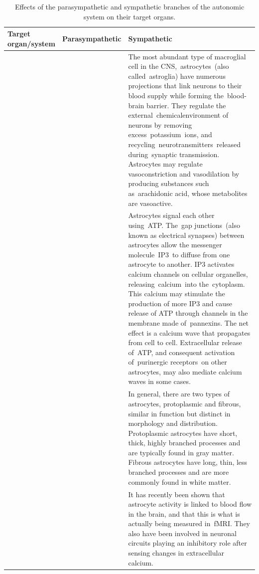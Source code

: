 \begin{longtable}[t]{>{\raggedright\arraybackslash}p{5em}>{\raggedright\arraybackslash}p{5em}>{\raggedright\arraybackslash}p{40em}}
\caption{\label{tab:autonomic}Effects of the parasympathetic and sympathetic branches of the autonomic system on their target organs.}\\
\toprule
Target organ/system & Parasympathetic & Sympathetic\\
\midrule
\rowcolor{gray!6}   &  & The most abundant type of macroglial cell in the CNS, astrocytes (also called astroglia) have numerous projections that link neurons to their blood supply while forming the blood-brain barrier. They regulate the external chemicalenvironment of neurons by removing excess potassium ions, and recycling neurotransmitters released during synaptic transmission. Astrocytes may regulate vasoconstriction and vasodilation by producing substances such as arachidonic acid, whose metabolites are vasoactive.\\

 &  & Astrocytes signal each other using ATP. The gap junctions (also known as electrical synapses) between astrocytes allow the messenger molecule IP3 to diffuse from one astrocyte to another. IP3 activates calcium channels on cellular organelles, releasing calcium into the cytoplasm. This calcium may stimulate the production of more IP3 and cause release of ATP through channels in the membrane made of pannexins. The net effect is a calcium wave that propagates from cell to cell. Extracellular release of ATP, and consequent activation of purinergic receptors on other astrocytes, may also mediate calcium waves in some cases.\\

\rowcolor{gray!6}   &  & In general, there are two types of astrocytes, protoplasmic and fibrous, similar in function but distinct in morphology and distribution. Protoplasmic astrocytes have short, thick, highly branched processes and are typically found in gray matter. Fibrous astrocytes have long, thin, less branched processes and are more commonly found in white matter.\\

 & \multirow{-4}{5em}{\raggedright\arraybackslash Astrocytes} & It has recently been shown that astrocyte activity is linked to blood flow in the brain, and that this is what is actually being measured in fMRI. They also have been involved in neuronal circuits playing an inhibitory role after sensing changes in extracellular calcium.\\


\end{longtable}
